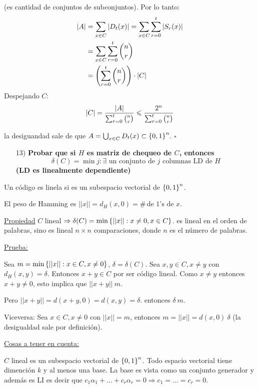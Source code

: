 \documentclass[12pt,a4paper]{article}
\begin{document}
(es cantidad de conjuntos de subconjuntos). Por lo tanto:
\begin{align*}
    |A| &= \sum_{x\in C} |D_{t}(x)| = \sum_{x\in C} \sum_{r=0}^{t} |S_{r}(x)|\\
    &= \sum_{x\in C} \sum_{r=0}^{t} \binom{n}{r}\\
    &= \left(\sum_{r=0}^{t} \binom{n}{r}\right) \cdot |C|\\
\end{align*}
Despejando $C$:
$$|C| = \frac{|A|}{\sum_{r=0}^{t} \binom{n}{r}}\leqslant \frac{2^{n}}{\sum_{r=0}^{t} \binom{n}{r}}$$

la desiguandad sale de que $A = \bigcup_{x\in C} D_{t}(x) \subset \left\lbrace 0,1 \right\rbrace^{n}$.
$\square$

\begin{itemize}
    \item [13)] \textbf{Probar que si $H$ es matriz de chequeo de $C$, entonces
        $$\delta(C) = \min {j: \exists \,\,\text{un conjunto de $j$ columnas LD de $H$}}$$
        (LD es linealmente dependiente)}
    \label{dem:delta}
\end{itemize}

Un código es linela si es un subespacio vectorial de $\left\lbrace 0,1 \right\rbrace^{n}$.

\begin{definition} El peso de Hamming es $||x||=d_{H}(x,0)=\# \, \text{de 1's de $x$}$.
\end{definition}

\underline{Propiedad} $C$ lineal $\Rightarrow \delta(C) = \min \left\lbrace ||x||: x\neq 0, x\in C \right\rbrace$.
es lineal en el orden de palabras, sino es lineal $n\times n$ comparaciones, donde 
$n$ es el número de palabras.
\medskip

\underline{Prueba:}
\medskip

Sea $m = \min \left\lbrace ||x|| :x\in C, x\neq 0 \right\rbrace$, $\delta= \delta(C)$.
Sea $x,y \in C, x\neq y$ con $d_{H}(x,y) = \delta$. Entonces $x+y\in C$ por ser 
código lineal. Como $x\neq y$ entonces $x+y\neq 0$, esto implica que $||x+y||\> m$.
\medskip

Pero $||x+y|| = d(x+y,0) = d(x,y) = \delta$. entonces $\delta \> m$.
\medskip

Viceversa: Sea $x\in C, x\neq 0$ con $||x|| = m$, entonces $m= ||x|| = d(x,0) \> \delta$ 
(la desigualdad sale por definición).
\medskip

\underline{Cosas a tener en cuenta:}
\medskip

$C$ lineal es un subespacio vectorial de $\left\lbrace 0,1 \right\rbrace^{n}$. Todo espacio vectorial 
tiene dimención $k$ y al menos una base. La base es vista como un conjunto generador y 
además es LI es decir que $c_{1}\alpha_{1}+\ldots + c_{r}\alpha_{r} = 0 \Rightarrow c_{1} = \ldots = c_{r} = 0$.
\medskip
\end{document}
